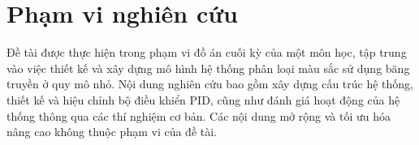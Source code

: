 \section{Phạm vi nghiên cứu}
Đề tài được thực hiện trong phạm vi đồ án cuối kỳ của một môn học, tập trung vào việc thiết kế và xây dựng mô hình hệ thống phân loại màu sắc sử dụng băng truyền ở quy mô nhỏ. Nội dung nghiên cứu bao gồm xây dựng cấu trúc hệ thống, thiết kế và hiệu chỉnh bộ điều khiển PID, cũng như đánh giá hoạt động của hệ thống thông qua các thí nghiệm cơ bản. Các nội dung mở rộng và tối ưu hóa nâng cao không thuộc phạm vi của đề tài.


